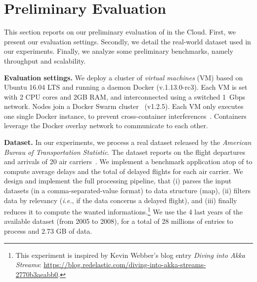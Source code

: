 \section{Preliminary Evaluation}
\label{sec:eval}

This section reports on our preliminary evaluation of \SYS in the Cloud.
First, we present our evaluation settings.
Secondly, we detail the real-world dataset used in our experiments.
Finally, we analyze some preliminary benchmarks, namely throughput and scalability.

\textbf{Evaluation settings.}
We deploy a cluster of \emph{virtual machines} (VM) based on Ubuntu 16.04 LTS and running a daemon Docker (v.1.13.0-rc3).
Each VM is set with 2 CPU cores and 2GB RAM, and interconnected using a switched 1~Gbps network.
Nodes join a Docker Swarm cluster~\cite{docker:swarm_2016} (v1.2.5).
Each VM only executes one single Docker instance, to prevent cross-container interferences~\cite{koh2007analysis}.
Containers leverage the Docker overlay network to communicate to each other.

\textbf{Dataset.}
In our experiments, we process a real dataset released by the \emph{American Bureau of Transportation Statistic}.
The dataset reports on the flight departures and arrivals of 20 air carriers~\cite{statistical_computing:data}.
We implement a benchmark application atop of \SYS to compute average delays and the total of delayed flights for each air carrier.
We design and implement the full processing pipeline, that (i) parses the input datasets (in a comma-separated-value format) to data structure (\textsf{map}), (ii) filters data by relevancy (\emph{i.e.}, if the data concerns a delayed flight), and (iii) finally reduces it to compute the wanted informations.\footnote{This experiment is inspired by Kevin Webber's blog entry \emph{Diving into Akka Streams}: \url{https://blog.redelastic.com/diving-into-akka-streams-2770b3aeabb0}.}
We use the 4 last years of the available dataset (from 2005 to 2008), for a total of 28 millions of entries to process and 2.73 GB of data.

